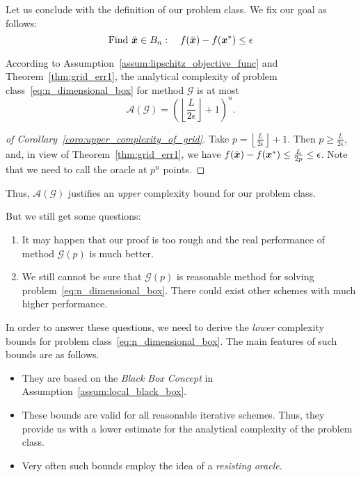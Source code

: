 Let us conclude with the definition of our problem class. We fix our goal as follows:
\begin{equation}\label{eq:goal_n_box}
    \text{Find} ~ \bar{\boldsymbol{x}} \in B_n : \quad f(\bar{\boldsymbol{x}}) - f(\boldsymbol{x}^*) \le \epsilon
\end{equation}

\begin{coro}\label{coro:upper_complexity_of_grid}
    According to Assumption~\ref{assum:lipschitz_objective_func} and
    Theorem~\ref{thm:grid_err1}, the analytical complexity of problem 
    class~\ref{eq:n_dimensional_box} for method \(\mathscr{G}\) is at most
    \[
        \mathscr{A}(\mathscr{G}) = \left( \left\lfloor \frac{L}{2\epsilon} \right\rfloor +1 \right)^n .
    \]
\end{coro}

\begin{proof}[of Corollary~\ref{coro:upper_complexity_of_grid}]
    Take \(p = \left\lfloor \frac{L}{2\epsilon} \right\rfloor +1\). Then \(p \ge \frac{L}{2\epsilon}\), and, in view of Theorem~\ref{thm:grid_err1}, 
    we have \(f(\bar{\boldsymbol{x}}) - f(\boldsymbol{x}^*) \le \frac{L}{2p} \le \epsilon\). Note that we need to call the oracle at \(p^n\) points.
\end{proof}

Thus, \(\mathscr{A}(\mathscr{G})\) justifies an \emph{upper} complexity bound for our problem class.

But we still get some questions:
\begin{enumerate}
    \item It may happen that our proof is too rough and the real performance of method \(\mathscr{G}(p)\) is much better.
    \item We still cannot be sure that \(\mathscr{G}(p)\) is reasonable method for solving problem~\ref{eq:n_dimensional_box}. There could exist other schemes with much higher performance.
\end{enumerate}
In order to answer these questions, we need to derive the \emph{lower} complexity bounds for problem class~\ref{eq:n_dimensional_box}. The main features of such bounds are as follows.
\begin{itemize}
    \item They are based on the \emph{Black Box Concept} in Assumption~\ref{assum:local_black_box}.
    \item These bounds are valid for all reasonable iterative schemes. Thus, they provide us with a lower estimate for the analytical complexity of the problem class.
    \item Very often such bounds employ the idea of a \emph{resisting oracle}.
\end{itemize}

